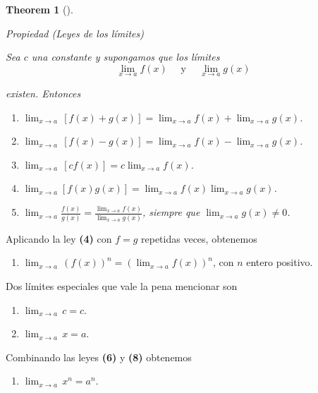 \documentclass[
  letterpaper,
]{book}
\providecommand{\tightlist}{%
  \setlength{\itemsep}{0pt}\setlength{\parskip}{0pt}}
\theoremstyle{plain}
\newtheorem{theorem}{Theorem}[chapter]
\theoremstyle{remark}
\begin{document}
\begin{theorem}[]\protect\hypertarget{thm-leyes-limites}{}\label{thm-leyes-limites}

Propiedad (Leyes de los límites)

Sea \(c\) una constante y supongamos que los límites \[
\lim_{x\to a} f(x) \quad \text{ y } \quad \lim_{x\to a}g(x)
\]

existen. Entonces

\begin{enumerate}
\def\labelenumi{\arabic{enumi}.}
\item
  \(\lim_{x\to a}\,[f(x)+g(x)]=\lim_{x\to a}f(x)+\lim_{x\to a} g(x)\).
\item
  \(\lim_{x\to a}\, [f(x)-g(x)]=\lim_{x\to a} f(x)-\lim_{x\to a} g(x)\).
\item
  \(\lim_{x\to a} \,[cf(x)]=c\lim_{x\to a} f(x)\).
\item
  \(\lim_{x\to a} [f(x)g(x)]=\lim_{x\to a} f(x) \lim_{x\to a} g(x)\).
\item
  \(\displaystyle \lim_{x\to a} \frac{f(x)}{g(x)}= \frac{\lim_{x\to a} f(x)}{\lim_{x\to a} g(x)}\),
  siempre que \(\lim_{x\to a} g(x)\neq 0\).
\end{enumerate}

\end{theorem}

Aplicando la ley \textbf{(4)} con \(f=g\) repetidas veces, obtenemos

\begin{enumerate}
\def\labelenumi{\arabic{enumi}.}
\setcounter{enumi}{5}
\tightlist
\item
  \(\lim_{x\to a}\,(f(x))^n=\left(\lim_{x\to a}f(x)\right)^n\), con
  \(n\) entero positivo.
\end{enumerate}

Dos límites especiales que vale la pena mencionar son

\begin{enumerate}
\def\labelenumi{\arabic{enumi}.}
\setcounter{enumi}{6}
\item
  \(\lim_{x\to a}\, c=c\).
\item
  \(\lim_{x\to a}\, x=a\).
\end{enumerate}

Combinando las leyes \textbf{(6)} y \textbf{(8)} obtenemos

\begin{enumerate}
\def\labelenumi{\arabic{enumi}.}
\setcounter{enumi}{8}
\tightlist
\item
  \(\lim_{x\to a}\, x^n=a^n\).
\end{enumerate}
\end{document}
